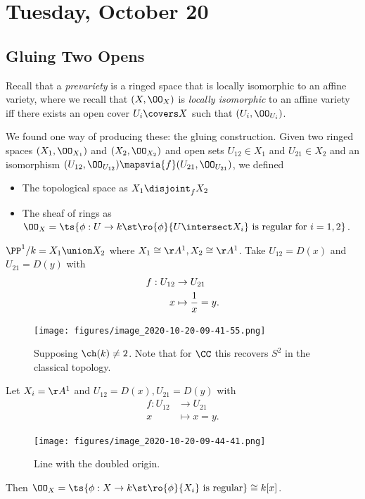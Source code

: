 \hypertarget{tuesday-october-20}{%
\section{Tuesday, October 20}\label{tuesday-october-20}}

\hypertarget{gluing-two-opens}{%
\subsection{Gluing Two Opens}\label{gluing-two-opens}}

Recall that a \emph{prevariety} is a ringed space that is locally
isomorphic to an affine variety, where we recall that \((X, \OO_X)\) is
\emph{locally isomorphic} to an affine variety iff there exists an open
cover \(U_i \covers X\) such that \((U_i, \OO_{U_i})\).

We found one way of producing these: the gluing construction. Given two
ringed spaces \((X_1, \OO_{X_1})\) and \((X_2, \OO_{X_2})\) and open
sets \(U_{12} \in X_1\) and \(U_{21} \in X_2\) and an isomorphism
\((U_{12}, \OO_{U_{12}}) \mapsvia{f} (U_{21}, \OO_{U_{21}})\), we
defined

\begin{itemize}
\tightlist
\item
  The topological space as \(X_1 \disjoint_f X_2\)
\item
  The sheaf of rings as
  \(\OO_X = \ts{\phi:U\to k \st\ro{\phi}{U\intersect X_i} \text{ is regular for } i=1,2 }\).
\end{itemize}

\begin{example}

\(\PP^1/k = X_1 \union X_2\) where \(X_1 \cong \AA^1, X_2 \cong \AA^1\).
Take \(U_{12} = D(x)\) and \(U_{21} = D(y)\) with
\begin{align*}  
f: U_{12} &\to U_{21} \\
x &\mapsto {1\over x} = y
.\end{align*}

\begin{figure}
\centering
\texttt{[image: figures/image\_2020-10-20-09-41-55.png]}
\caption{Supposing \(\ch(k) \neq 2\). Note that for \(\CC\) this
recovers \(S^2\) in the classical topology.}
\end{figure}

\end{example}

\begin{example}

Let \(X_i = \AA^1\) and \(U_{12} = D(x), U_{21} = D(y)\) with
\begin{align*}  
f: U_{12} &\to U_{21} \\
x &\mapsto x=y
.\end{align*}

\begin{figure}
\centering
\texttt{[image: figures/image\_2020-10-20-09-44-41.png]}
\caption{Line with the doubled origin.}
\end{figure}

Then
\(\OO_X = \ts{\phi: X\to k \st \ro{\phi}{X_i} \text{ is regular}} \cong k[x]\).

\end{example}

